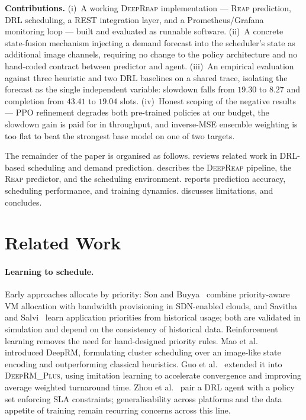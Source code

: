 \documentclass{svproc}
\newcommand{\reap}{\textsc{Reap}}
\newcommand{\deeprm}{\textsc{DeepRM\_Plus}}
\newcommand{\deepreap}{\textsc{DeepReap}}
\begin{document}
\textbf{Contributions.}
(i)~A working \deepreap{} implementation --- \reap{} prediction, DRL
scheduling, a REST integration layer, and a Prometheus/Grafana
monitoring loop --- built and evaluated as runnable software.
(ii)~A concrete state-fusion mechanism injecting a demand forecast into
the scheduler's state as additional image channels, requiring no change
to the policy architecture and no hand-coded contract between predictor
and agent. (iii)~An empirical evaluation against three heuristic and
two DRL baselines on a shared trace, isolating the forecast as the
single independent variable: slowdown falls from $19.30$ to $8.27$ and
completion from $43.41$ to $19.04$ slots. (iv)~Honest scoping of the
negative results --- PPO refinement degrades both pre-trained policies
at our budget, the slowdown gain is paid for in throughput, and
inverse-MSE ensemble weighting is too flat to beat the strongest base
model on one of two targets.

The remainder of the paper is organised as follows. 
reviews related work in DRL-based scheduling and demand prediction.
 describes the \deepreap{} pipeline, the \reap{}
predictor, and the scheduling environment.  reports
prediction accuracy, scheduling performance, and training dynamics.
 discusses limitations, and
 concludes.

\section{Related Work}\label{sec:relwork}
\paragraph{Learning to schedule.} Early approaches allocate by
priority: Son and Buyya~\cite{son2019} combine priority-aware VM
allocation with bandwidth provisioning in SDN-enabled clouds, and
Savitha and Salvi~\cite{savitha2021} learn application priorities from
historical usage; both are validated in simulation and depend on the
consistency of historical data. Reinforcement learning removes the need
for hand-designed priority rules. Mao et al.~\cite{mao2016} introduced
DeepRM, formulating cluster scheduling over an image-like state
encoding and outperforming classical heuristics. Guo
et al.~\cite{guo2021} extended it into \deeprm{}, using imitation
learning to accelerate convergence and improving average weighted
turnaround time. Zhou et al.~\cite{zhou2021} pair a DRL agent with a
policy set enforcing SLA constraints; generalisability across
platforms and the data appetite of training remain recurring concerns
across this line.
\end{document}
